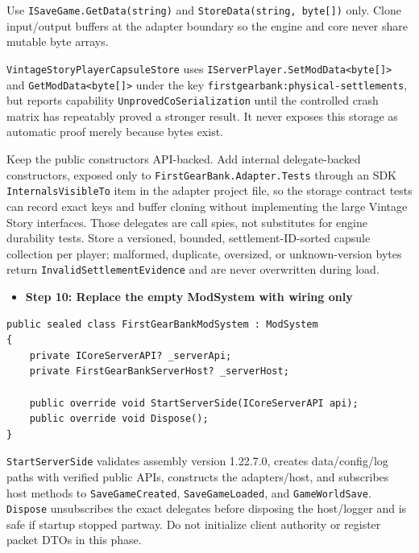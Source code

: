 \documentclass[
  10pt,
  letterpaper,
]{article}
\newcommand{\passthrough}[1]{#1}
\providecommand{\tightlist}{%
  \setlength{\itemsep}{0pt}\setlength{\parskip}{0pt}}
\begin{document}
Use
\texttt{ISaveGame.}\allowbreak{}\texttt{GetData(}\allowbreak{}\texttt{string)}\allowbreak{}
and
\texttt{StoreData(}\allowbreak{}\texttt{string,}\allowbreak{}\texttt{\ }\allowbreak{}\texttt{byte[])}\allowbreak{}
only. Clone input/output buffers at the adapter boundary so the engine
and core never share mutable byte arrays.

\texttt{VintageStoryPlayerCapsuleStore} uses
\texttt{IServerPlayer.}\allowbreak{}\texttt{SetModData\textless{}}\allowbreak{}\texttt{byte[]\textgreater{}}\allowbreak{}
and \passthrough{\lstinline!GetModData<byte[]>!} under the key
\texttt{firstgearbank:}\allowbreak{}\texttt{physical-}\allowbreak{}\texttt{settlements},
but reports capability \passthrough{\lstinline!UnprovedCoSerialization!}
until the controlled crash matrix has repeatably proved a stronger
result. It never exposes this storage as automatic proof merely because
bytes exist.

Keep the public constructors API-backed. Add internal delegate-backed
constructors, exposed only to
\texttt{FirstGearBank.}\allowbreak{}\texttt{Adapter.}\allowbreak{}\texttt{Tests}
through an SDK \passthrough{\lstinline!InternalsVisibleTo!} item in the
adapter project file, so the storage contract tests can record exact
keys and buffer cloning without implementing the large Vintage Story
interfaces. Those delegates are call spies, not substitutes for engine
durability tests. Store a versioned, bounded, settlement-ID-sorted
capsule collection per player; malformed, duplicate, oversized, or
unknown-version bytes return \texttt{InvalidSettlementEvidence} and are
never overwritten during load.

\begin{itemize}
\tightlist
\item[$\square$]
  \textbf{Step 10: Replace the empty ModSystem with wiring only}
\end{itemize}

\begin{lstlisting}
public sealed class FirstGearBankModSystem : ModSystem
{
    private ICoreServerAPI? _serverApi;
    private FirstGearBankServerHost? _serverHost;

    public override void StartServerSide(ICoreServerAPI api);
    public override void Dispose();
}
\end{lstlisting}

\passthrough{\lstinline!StartServerSide!} validates assembly version
1.22.7.0, creates data/\allowbreak{}config/\allowbreak{}log paths with
verified public APIs, constructs the adapters/host, and subscribes host
methods to \passthrough{\lstinline!SaveGameCreated!},
\passthrough{\lstinline!SaveGameLoaded!}, and
\passthrough{\lstinline!GameWorldSave!}.
\passthrough{\lstinline!Dispose!} unsubscribes the exact delegates
before disposing the host/logger and is safe if startup stopped partway.
Do not initialize client authority or register packet DTOs in this
phase.
\end{document}
